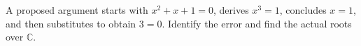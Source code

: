 A proposed argument starts with $x^2+x+1=0$, derives $x^3=1$, concludes $x=1$, and then substitutes to obtain $3=0$. Identify the error and find the actual roots over $\mathbb C$.
